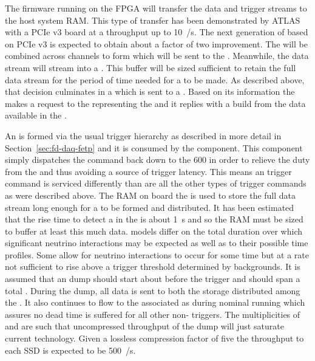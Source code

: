 The firmware running on the  FPGA will transfer the data
and trigger streams to the host system RAM. 
This type of transfer has been demonstrated by ATLAS with a PCIe v3
 board at a throughput up to \SI{10}{\GB/\s}. 
The next generation of  based on PCIe v3 is expected to
obtain about a factor of two improvement.
The  will be combined across channels to form
 which will be sent to the .
Meanwhile, the data stream will stream into a . 
This buffer will be sized sufficient to retain the full data stream
for the period of time needed for a  to be made. 
As described above, that decision culminates in a 
which is sent to a . 
Based on its information the  makes a request to the
 representing the  and it replies with a
 build from the data available in the .

An   is formed via the usual trigger
hierarchy as described in more detail in Section~\ref{sec:fd-daq-fetp}
and it is consumed by the  component. 
This component simply dispatches the command back down to the 600
 in order to relieve the duty from the  and
thus avoiding a source of trigger latency.
This means an  trigger command is serviced differently than
are all the other types of trigger commands as were described above.
The RAM on board the  is used to store the full data
stream long enough for a   to be formed
and distributed. 
It has been estimated that the rise time to detect a  in
the   is about \SI{1}{\s} and so the RAM
must be sized to buffer at least this much data.
 models differ on the total duration over which significant
neutrino interactions may be expected as well as to their possible
time profiles. 
Some allow for  neutrino interactions to occur for some
time but at a rate not sufficient to rise above a trigger threshold
determined by  backgrounds. 
It is assumed that an  dump should start about \snbpretime
before the  trigger and should span a total \snbtime.
During the dump, all data is sent to both the  storage
distributed among the . 
It also continues to flow to the associated  as during
nominal running which assures no dead time is suffered for all other
non- triggers. 
The multiplicities of  and  are such that
uncompressed throughput of the  dump will just saturate
current technology. 
Given a lossless compression factor of five the throughput to each SSD
is expected to be \SI{500}{\MB/\s}.

